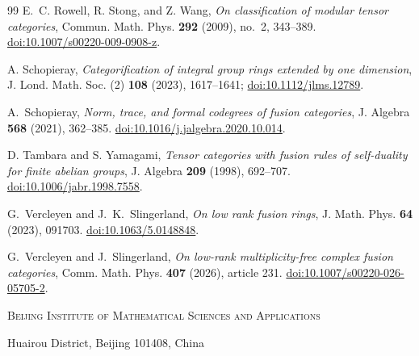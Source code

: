 \documentclass[11pt,a4paper]{article}
\theoremstyle{definition}\newtheorem{definition}[theorem]{Definition}
\theoremstyle{remark}\newtheorem{remark}[theorem]{Remark}
\numberwithin{equation}{section}
\begin{document}
\begin{thebibliography}{99}
E.~C. Rowell, R. Stong, and Z. Wang, \emph{On classification of modular
 tensor categories}, Commun. Math. Phys. \textbf{292} (2009), no.~2, 343--389.
\href{https://doi.org/10.1007/s00220-009-0908-z}{doi:10.1007/s00220-009-0908-z}.

A. Schopieray,
\emph{Categorification of integral group rings extended by one dimension},
J. Lond. Math. Soc. (2) \textbf{108} (2023), 1617--1641;
\href{https://doi.org/10.1112/jlms.12789}{doi:10.1112/jlms.12789}.

A.~Schopieray, \emph{Norm, trace, and formal
codegrees of fusion categories}, J. Algebra \textbf{568} (2021), 362--385.
\href{https://doi.org/10.1016/j.jalgebra.2020.10.014}{doi:10.1016/j.jalgebra.2020.10.014}.

D. Tambara and S. Yamagami,
\emph{Tensor categories with fusion rules of self-duality for finite abelian groups},
J. Algebra \textbf{209} (1998), 692--707.
\href{https://doi.org/10.1006/jabr.1998.7558}{doi:10.1006/jabr.1998.7558}.

G.~Vercleyen and J.~K.~Slingerland,
\emph{On low rank fusion rings}, J. Math. Phys. \textbf{64} (2023), 091703.
\href{https://doi.org/10.1063/5.0148848}{doi:10.1063/5.0148848}.

G.~Vercleyen and J.~Slingerland, \emph{On low-rank
multiplicity-free complex fusion categories}, Comm. Math. Phys. \textbf{407}
(2026), article 231.
\href{https://doi.org/10.1007/s00220-026-05705-2}{doi:10.1007/s00220-026-05705-2}.
\end{thebibliography}
\endgroup

\par\medskip
{\small\noindent\textsc{Beijing Institute of Mathematical Sciences and Applications}\par
\noindent Huairou District, Beijing 101408, China\par}
\end{document}
